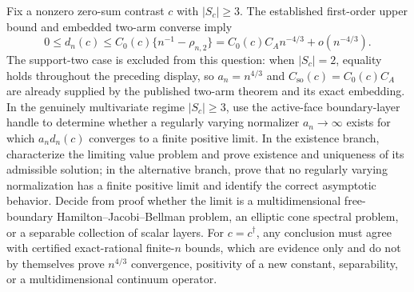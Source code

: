 Fix a nonzero zero-sum contrast \(c\) with \(|S_c|\geq3\). The established first-order upper bound and embedded two-arm converse imply
\[
 0\leq d_n(c)\leq C_0(c)\{n^{-1}-\rho_{n,2}\}
 =C_0(c)C_A n^{-4/3}+o(n^{-4/3}).
\]
The support-two case is excluded from this question: when \(|S_c|=2\), equality holds throughout the preceding display, so \(a_n=n^{4/3}\) and \(C_{\mathrm{so}}(c)=C_0(c)C_A\) are already supplied by the published two-arm theorem and its exact embedding. In the genuinely multivariate regime \(|S_c|\geq3\), use the active-face boundary-layer handle to determine whether a regularly varying normalizer \(a_n\to\infty\) exists for which \(a_nd_n(c)\) converges to a finite positive limit. In the existence branch, characterize the limiting value problem and prove existence and uniqueness of its admissible solution; in the alternative branch, prove that no regularly varying normalization has a finite positive limit and identify the correct asymptotic behavior. Decide from proof whether the limit is a multidimensional free-boundary Hamilton--Jacobi--Bellman problem, an elliptic cone spectral problem, or a separable collection of scalar layers. For \(c=c^\dagger\), any conclusion must agree with certified exact-rational finite-\(n\) bounds, which are evidence only and do not by themselves prove \(n^{4/3}\) convergence, positivity of a new constant, separability, or a multidimensional continuum operator.